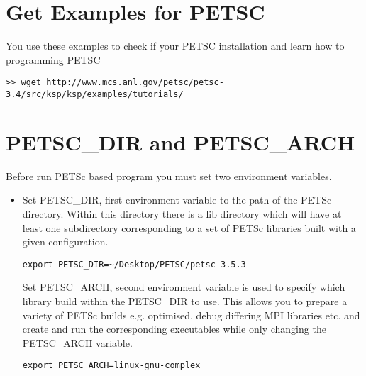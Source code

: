 \documentclass{article}
\begin{document}
\section{Get Examples for PETSC}
You use these examples to check if your PETSC installation and learn how to programming PETSC
\begin{scriptsize}\begin{verbatim}
>> wget http://www.mcs.anl.gov/petsc/petsc-3.4/src/ksp/ksp/examples/tutorials/
\end{verbatim}\end{scriptsize}
\section{PETSC\_DIR and PETSC\_ARCH} 
Before run PETSc based program you must set two environment variables.
\begin{itemize}
 \item Set PETSC\_DIR, first environment variable to the path of the PETSc directory. Within this directory there is a lib directory which will have at least one subdirectory corresponding to a set of PETSc libraries built with a given configuration.
\begin{verbatim}
export PETSC_DIR=~/Desktop/PETSC/petsc-3.5.3
\end{verbatim}
Set PETSC\_ARCH, second environment variable is used to specify which library build within the PETSC\_DIR to use. This allows you to prepare a variety of PETSc builds e.g. optimised, debug differing MPI libraries etc. and create and run the corresponding executables while only changing the PETSC\_ARCH variable.
\begin{verbatim}
export PETSC_ARCH=linux-gnu-complex
\end{verbatim}
\end{itemize}
\end{document}
